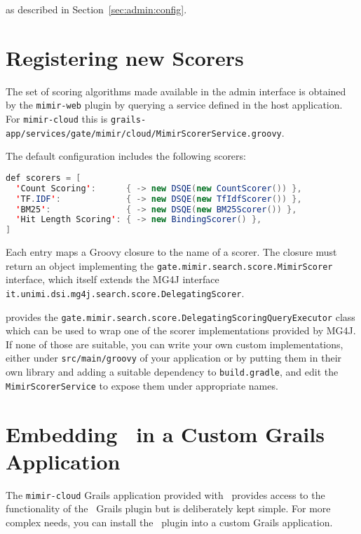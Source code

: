 as described in Section~\ref{sec:admin:config}.
\section{Registering new Scorers}
\label{sec:extend:scorers}

The set of scoring algorithms made available in the admin interface is obtained
by the {\tt mimir-web} plugin by querying a service defined in the host
application.  For {\tt mimir-cloud} this is
{\tt grails-app/services/gate/mimir/cloud/MimirScorerService.groovy}.

The default configuration includes the following scorers:
\begin{lstlisting}[language=Java]
def scorers = [
  'Count Scoring':      { -> new DSQE(new CountScorer()) },
  'TF.IDF':             { -> new DSQE(new TfIdfScorer()) },
  'BM25':               { -> new DSQE(new BM25Scorer()) },
  'Hit Length Scoring': { -> new BindingScorer() },
]
\end{lstlisting}

Each entry maps a Groovy closure to the name of a scorer. The closure must
return an object implementing the
\lstinline!gate.mimir.search.score.MimirScorer! interface, which itself extends
the MG4J interface \lstinline!it.unimi.dsi.mg4j.search.score.DelegatingScorer!.

\Mimir{} provides the
\lstinline!gate.mimir.search.score.DelegatingScoringQueryExecutor! class which
can be used to wrap one of the scorer implementations provided by MG4J. If none
of those are suitable, you can write your own custom implementations, either
under {\tt src/main/groovy} of your application or by putting them in their own
library and adding a suitable dependency to {\tt build.gradle}, and edit the
{\tt MimirScorerService} to expose them under appropriate names.
 

\section{Embedding \Mimir\ in a Custom Grails Application}
\label{sec:extend:customapp}

The {\tt mimir-cloud} Grails application provided with \Mimir\ provides access
to the functionality of the \Mimir\ Grails plugin but is deliberately kept
simple. For more complex needs, you can install the \Mimir\ plugin into a custom
Grails application.

